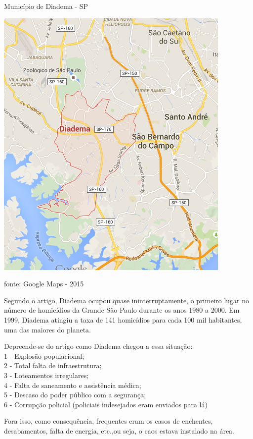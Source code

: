 \documentclass[
	12pt,				%
	openright,			%
	twoside,			%
	a4paper,			%
	chapter=TITLE,		%
	section=TITLE,		%
	subsection=TITLE,	%
	subsubsection=TITLE,%
	spanish,            %
	english,			%
	brazil				%
	]{abntex2}
\begin{document}
\begin{mapa}[h]
	\caption{\label{Mapa1}Município de Diadema - SP}
	\begin{center}
		\includegraphics[scale=1.0]{diadema.png}
	\end{center}
	\ABNTEXchapterfont\small{fonte: Google Maps - 2015}
\end{mapa}
\par
Segundo o artigo, Diadema ocupou quase ininterruptamente, o primeiro lugar no número de homicídios da Grande São Paulo durante os anos 1980 a 2000. Em 1999, Diadema atingiu a taxa de 141 homicídios para cada 100 mil habitantes, uma das maiores do planeta.
\par
Depreende-se do artigo como Diadema chegou a essa situação:\\
1 - Explosão populacional;\\
2 - Total falta de infraestrutura;\\
3 - Loteamentos irregulares;\\
4 - Falta de saneamento e assistência médica;\\
5 - Descaso do poder público com a segurança;\\
6 - Corrupção policial (policiais indesejados eram enviados para lá)\\
\par
Fora isso, como consequência, frequentes eram os casos de enchentes, desabamentos, falta de energia, etc.,ou seja, o caos estava instalado na área. 
\end{document}
